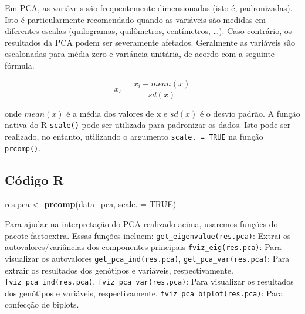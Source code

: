\documentclass[
]{book}
\newenvironment{Shaded}{\begin{snugshade}}{\end{snugshade}}
\newcommand{\DataTypeTok}[1]{\textcolor[rgb]{0.13,0.29,0.53}{#1}}
\newcommand{\KeywordTok}[1]{\textcolor[rgb]{0.13,0.29,0.53}{\textbf{#1}}}
\newcommand{\NormalTok}[1]{#1}
\newcommand{\OperatorTok}[1]{\textcolor[rgb]{0.81,0.36,0.00}{\textbf{#1}}}
\newcommand{\OtherTok}[1]{\textcolor[rgb]{0.56,0.35,0.01}{#1}}
\newcommand{\StringTok}[1]{\textcolor[rgb]{0.31,0.60,0.02}{#1}}
\begin{document}
\begin{Shaded}
\end{Shaded}

Em PCA, as variáveis são frequentemente dimensionadas (isto é, padronizadas). Isto é particularmente recomendado quando as variáveis são medidas em diferentes escalas (quilogramas, quilômetros, centímetros, \ldots). Caso contrário, os resultados da PCA podem ser severamente afetados. Geralmente as variáveis são escalonadas para média zero e variáncia unitária, de acordo com a seguinte fórmula.

\[
x_s = \frac{x_i- mean(x)}{sd(x)}
\]

onde \(mean(x)\) é a média dos valores de x e \(sd(x)\) é o desvio padrão. A função nativa do R \texttt{scale()} pode ser utilizada para padronizar os dados. Isto pode ser realizado, no entanto, utilizando o argumento \texttt{scale.\ =\ TRUE} na função \texttt{prcomp()}.

\hypertarget{cuxf3digo-r}{%
\subsection{Código R}\label{cuxf3digo-r}}

\begin{Shaded}
\begin{Highlighting}[]
\NormalTok{res.pca <-}\StringTok{ }\KeywordTok{prcomp}\NormalTok{(data_pca, }\DataTypeTok{scale. =} \OtherTok{TRUE}\NormalTok{)}
\end{Highlighting}
\end{Shaded}

Para ajudar na interpretação do PCA realizado acima, usaremos funções do pacote factoextra. Essas funções incluem:
\texttt{get\_eigenvalue(res.pca)}: Extrai os autovalores/variâncias dos componentes principais
\texttt{fviz\_eig(res.pca)}: Para visualizar os autovalores
\texttt{get\_pca\_ind(res.pca)}, \texttt{get\_pca\_var(res.pca)}: Para extrair os resultados dos genótipos e variáveis, respectivamente.
\texttt{fviz\_pca\_ind(res.pca)}, \texttt{fviz\_pca\_var(res.pca)}: Para visualizar os resultados dos genótipos e variáveis, respectivamente.
\texttt{fviz\_pca\_biplot(res.pca)}: Para confecção de biplots.
\end{document}
